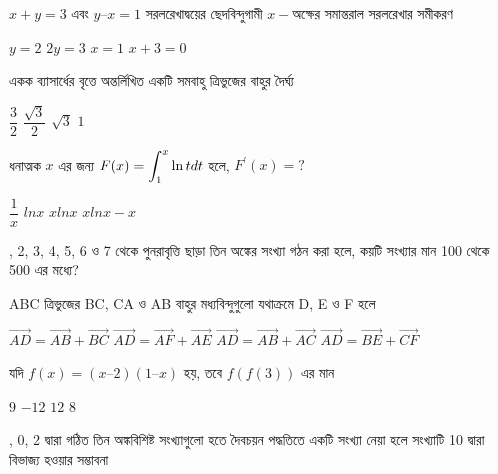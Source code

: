 \documentclass[addpoints]{exam}
\begin{document}
\begin{questions}
\question  $x + y = 3$ এবং $y – x = 1$ সরলরেখাদ্বয়ের ছেদবিন্দুগামী $x-$অক্ষের সমান্তরাল সরলরেখার সমীকরণ

\begin{oneparchoices}
\choice $ y=2 $
\choice $ 2y =3 $
\choice $ x=1 $
\choice $ x+3=0 $

\end{oneparchoices}

\question  একক ব্যাসার্ধের বৃত্তে অন্তর্লিখিত একটি সমবাহু ত্রিভুজের বাহুর দৈর্ঘ্য

\begin{oneparchoices}
\choice $ \dfrac{3}{2} $
\choice $ \dfrac{\sqrt{3}}{2} $
\choice $ \sqrt{3} $
\choice $ 1 $
\end{oneparchoices}

\question   ধনাত্মক $ x $ এর জন্য $ F(x) = \mathlarger{\int_{1}^{x}\ln t dt} $ হলে, $ F^{\prime} (x) = ?$

\begin{oneparchoices}
\choice $ \dfrac{1}{x} $
\choice $ lnx $
\choice $ xlnx $
\choice $ xlnx -x $

\end{oneparchoices}

, 2, 3, 4, 5, 6 ও 7 থেকে পুনরাবৃত্তি ছাড়া তিন অঙ্কের সংখ্যা গঠন করা হলে, কয়টি সংখ্যার মান 100 থেকে 500 এর মধ্যে?

\begin{oneparchoices}

\end{oneparchoices}

\question  ABC ত্রিভুজের BC, CA ও AB বাহুর মধ্যবিন্দুগুলো যথাক্রমে D, E ও F হলে

\begin{oneparchoices}
\choice $ \vec{AD} = \vec{AB} + \vec{BC} $
\choice $ \vec{AD} = \vec{AF} + \vec{AE} $
\choice $ \vec{AD} = \vec{AB} + \vec{AC} $
\choice $ \vec{AD} = \vec{BE} + \vec{CF} $

\end{oneparchoices}

\question যদি  $  f(x) = (x – 2)(1 – x) $ হয়, তবে $ f(f(3)) $ এর মান

\begin{oneparchoices}
\choice $ 9 $
\choice $ -12 $
\choice $ 12 $
\choice $ 8 $

\end{oneparchoices}

, 0, 2 দ্বারা গঠিত তিন অঙ্কবিশিষ্ট সংখ্যাগুলো হতে দৈবচয়ন পদ্ধতিতে একটি সংখ্যা নেয়া হলে সংখ্যাটি 10 দ্বারা বিভাজ্য হওয়ার সম্ভাবনা


\end{questions}
\end{document}
